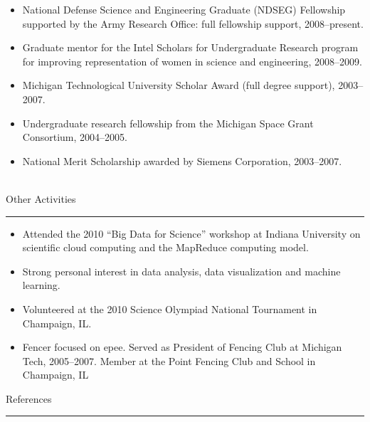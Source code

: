 \documentclass[10pt]{article}
\newcommand{\bigsection}[1]{	
	\vspace{4pt}
	{\fontfamily{phv}\selectfont\Large#1}

	\vspace{-10pt} \rule{\textwidth}{1pt}
}
\begin{document}
\vspace{-16pt}

\begin{itemize}\setlength{\itemsep}{0cm}
  \setlength{\parskip}{0cm}
	\item{National Defense Science and Engineering Graduate (NDSEG) Fellowship supported by the Army Research Office: full
	fellowship support, 2008--present.}

	\item{Graduate mentor for the Intel Scholars for Undergraduate Research program for improving representation of women in science and engineering, 2008--2009.}

	\item{Michigan Technological University Scholar Award (full degree support), 2003--2007.}


	\item{Undergraduate research fellowship from the Michigan Space Grant Consortium, 2004--2005.}

	\item{National Merit Scholarship awarded by Siemens Corporation, 2003--2007.\\ \ }
\end{itemize}

\vspace{-8pt}

\bigsection{Other Activities}
\begin{itemize}\setlength{\itemsep}{0cm}
  \setlength{\parskip}{0cm}


	\item Attended the 2010 ``Big Data for Science'' workshop at Indiana University on scientific cloud computing and the MapReduce computing model.
	\item Strong personal interest in data analysis, data visualization and machine learning.
	\item Volunteered at the 2010 Science Olympiad National Tournament in Champaign, IL.
	\item Fencer focused on epee. Served as President of Fencing Club at Michigan Tech, 2005--2007.  Member at the Point Fencing Club and School in Champaign, IL 

\end{itemize}

\bigsection{References}
\end{document}
